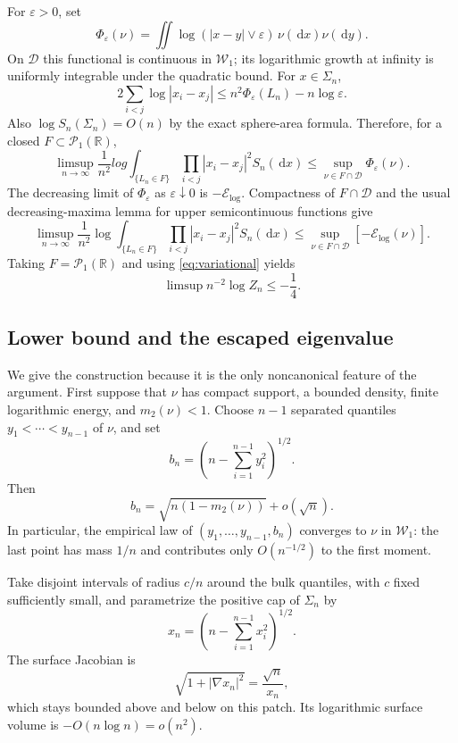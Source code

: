 \documentclass[11pt]{article}
\newcommand{\R}{\mathbb R}
\newcommand{\Pone}{\mathcal P_1(\R)}
\newcommand{\W}{\mathcal W}
\newcommand{\E}{\mathcal E_{\log}}
\newcommand{\dd}{\,\mathrm d}
\begin{document}
For $\varepsilon>0$, set
\[
 \Phi_\varepsilon(\nu)=
 \iint\log(|x-y|\vee\varepsilon)\,\nu(\dd x)\nu(\dd y).
\]
On $\mathcal D$ this functional is continuous in $\W_1$; its logarithmic
growth at infinity is uniformly integrable under the quadratic bound. For
$x\in\Sigma_n$,
\begin{equation}\label{eq:truncate-upper}
 2\sum_{i<j}\log|x_i-x_j|
 \le n^2\Phi_\varepsilon(L_n)-n\log\varepsilon.
\end{equation}
Also $\log S_n(\Sigma_n)=O(n)$ by the exact sphere-area formula. Therefore,
for a closed $F\subset\Pone$,
\begin{equation}\label{eq:unnormalized-upper}
 \limsup_{n\to\infty}\frac1{n^2}log
 \int_{\{L_n\in F\}}\prod_{i<j}|x_i-x_j|^2S_n(\dd x)
 \le \sup_{\nu\in F\cap\mathcal D}\Phi_\varepsilon(\nu).
\end{equation}
The decreasing limit of $\Phi_\varepsilon$ as $\varepsilon\downarrow0$ is
$-\E$. Compactness of $F\cap\mathcal D$ and the usual decreasing-maxima
lemma for upper semicontinuous functions give
\begin{equation}\label{eq:unnormalized-upper2}
 \limsup_{n\to\infty}\frac1{n^2}\log
 \int_{\{L_n\in F\}}\prod_{i<j}|x_i-x_j|^2S_n(\dd x)
 \le \sup_{\nu\in F\cap\mathcal D}[-\E(\nu)].
\end{equation}
Taking $F=\Pone$ and using \eqref{eq:variational} yields
\[
 \limsup n^{-2}\log Z_n\le-\frac14.
\]

\subsection{Lower bound and the escaped eigenvalue}

We give the construction because it is the only noncanonical feature of the
argument. First suppose that $\nu$ has compact support, a bounded density,
finite logarithmic energy, and $m_2(\nu)<1$. Choose $n-1$ separated quantiles
$y_1<\cdots<y_{n-1}$ of $\nu$, and set
\begin{equation}\label{eq:outlier}
 b_n=\left(n-\sum_{i=1}^{n-1}y_i^2\right)^{1/2}.
\end{equation}
Then
\[
 b_n=\sqrt{n(1-m_2(\nu))}+o(\sqrt n).
\]
In particular, the empirical law of $(y_1,\ldots,y_{n-1},b_n)$ converges to
$\nu$ in $\W_1$: the last point has mass $1/n$ and contributes only
$O(n^{-1/2})$ to the first moment.

Take disjoint intervals of radius $c/n$ around the bulk quantiles, with $c$
fixed sufficiently small, and parametrize the positive cap of $\Sigma_n$ by
\begin{equation}\label{eq:cap}
 x_n=\left(n-\sum_{i=1}^{n-1}x_i^2\right)^{1/2}.
\end{equation}
The surface Jacobian is
\[
 \sqrt{1+|\nabla x_n|^2}=\frac{\sqrt n}{x_n},
\]
which stays bounded above and below on this patch. Its logarithmic surface
volume is $-O(n\log n)=o(n^2)$.
\end{document}
